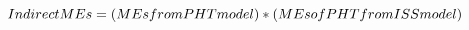 \[Indirect{\rm{ }}MEs = \left( {MEs{\rm{ }}from{\rm{ }}PHT{\rm{ }}model} \right)*\left( {MEs{\rm{ }}of{\rm{ }}PHT{\rm{ }}from{\rm{ }}ISS{\rm{ }}model} \right)\]
